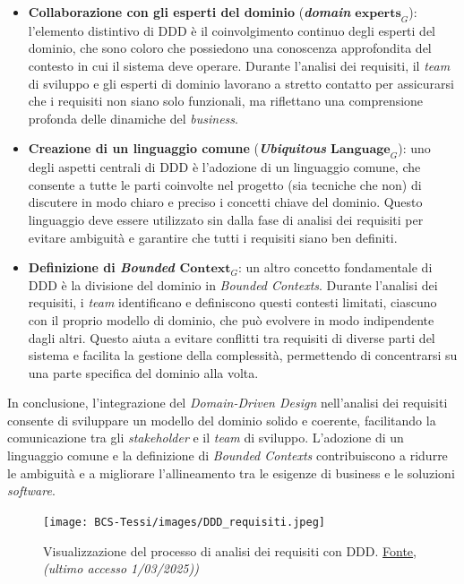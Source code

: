         \begin{itemize}
        \item \textbf{Collaborazione con gli esperti del dominio} (\textit{\textbf{domain} $\textbf{experts}_G$}): l’elemento distintivo di DDD è il coinvolgimento continuo degli esperti del dominio, che sono coloro che possiedono una conoscenza approfondita del contesto in cui il sistema deve operare. Durante l'analisi dei requisiti, il \textit{team} di sviluppo e gli esperti di dominio lavorano a stretto contatto per assicurarsi che i requisiti non siano solo funzionali, ma riflettano una comprensione profonda delle dinamiche del \textit{business}.

        \item \textbf{Creazione di un linguaggio comune} (\textit{\textbf{Ubiquitous} $\textbf{Language}_G$}): uno degli aspetti centrali di DDD è l’adozione di un linguaggio comune, che consente a tutte le parti coinvolte nel progetto (sia tecniche che non) di discutere in modo chiaro e preciso i concetti chiave del dominio. Questo linguaggio deve essere utilizzato sin dalla fase di analisi dei requisiti per evitare ambiguità e garantire che tutti i requisiti siano ben definiti.

        \item \textbf{Definizione di \textit{Bounded $\textbf{Context}_G$}}: un altro concetto fondamentale di DDD è la divisione del dominio in \textit{Bounded Contexts}. Durante l'analisi dei requisiti, i \textit{team} identificano e definiscono questi contesti limitati, ciascuno con il proprio modello di dominio, che può evolvere in modo indipendente dagli altri. Questo aiuta a evitare conflitti tra requisiti di diverse parti del sistema e facilita la gestione della complessità, permettendo di concentrarsi su una parte specifica del dominio alla volta.
        \end{itemize}

        \noindent In conclusione, l’integrazione del \textit{Domain-Driven Design} nell’analisi dei requisiti consente di sviluppare un modello del dominio solido e coerente, facilitando la comunicazione tra gli \textit{stakeholder} e il \textit{team} di sviluppo. L’adozione di un linguaggio comune e la definizione di \textit{Bounded Contexts} contribuiscono a ridurre le ambiguità e a migliorare l’allineamento tra le esigenze di business e le soluzioni \textit{software}.
        
        \begin{figure} [H]
            \centering
            \texttt{[image: BCS-Tessi/images/DDD\_requisiti.jpeg]}
            \caption{Visualizzazione del processo di analisi dei requisiti con DDD. \href{https://medium.com/raa-labs/part-1-domain-driven-design-like-a-pro-f9e78d081f10}{Fonte}, \textit{(ultimo accesso 1/03/2025))}}
            \label{fig:AR-DDD}
        \end{figure}
        
